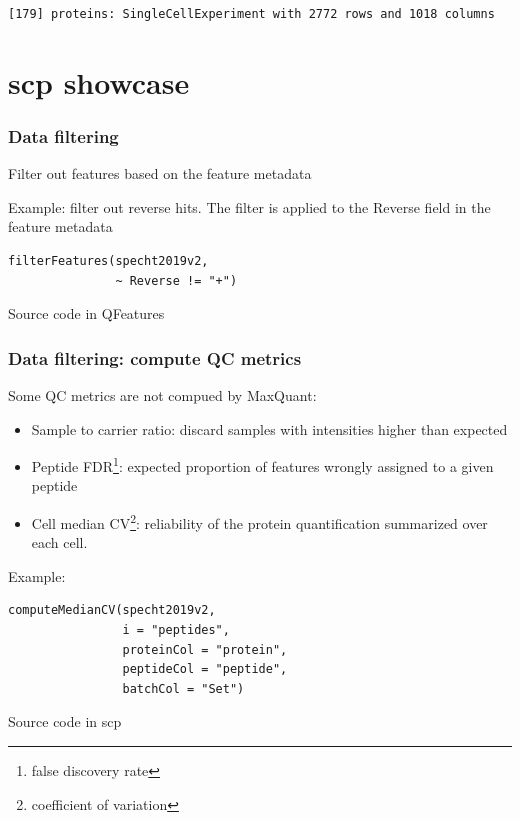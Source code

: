 \documentclass{beamer}
\newcommand{\hcode}[2][lgray]{{\ttfamily\color{vdgray}\colorbox{#1}{#2}}}
\newcommand{\frametitlesection}[1]{\frametitle{\centering #1 \footnotesize \hspace{0pt plus 1 filll} \insertsection}}
\begin{document}
\begin{frame}[fragile]
    \begin{lstlisting}[language = TeX, numbers = none, basicstyle = \ttfamily\@setfontsize{\srcsize}{5pt}{5pt}\color{vdgray}]
 [179] proteins: SingleCellExperiment with 2772 rows and 1018 columns
    \end{lstlisting}


\end{frame}


\section{scp showcase}


\begin{frame}[fragile]
    \frametitlesection{Data filtering}

    Filter out features based on the feature metadata

    \bigskip

    Example: filter out reverse hits. The filter is applied to the
    \hcode{Reverse} field in the feature metadata

    \begin{lstlisting}
filterFeatures(specht2019v2,
               ~ Reverse != "+")
    \end{lstlisting}

    Source code in \hcode{QFeatures}
\end{frame}

\begin{frame}[fragile]
    \frametitlesection{Data filtering: compute QC metrics}
    \small
    Some QC metrics are not compued by MaxQuant: 
    
    \begin{itemize}
        \item{Sample to carrier ratio}: discard samples with intensities higher 
        than expected
        \item{Peptide FDR\footnote{false discovery rate}: expected proportion of 
        features wrongly assigned to a given peptide}
        \item{Cell median CV\footnote{coefficient of variation}: reliability of 
        the protein quantification summarized over each cell.}
    \end{itemize}

    Example:

    \begin{lstlisting}
computeMedianCV(specht2019v2,
                i = "peptides",
                proteinCol = "protein",
                peptideCol = "peptide",
                batchCol = "Set")
    \end{lstlisting}

    Source code in \hcode{scp}

\end{frame}
\end{document}
